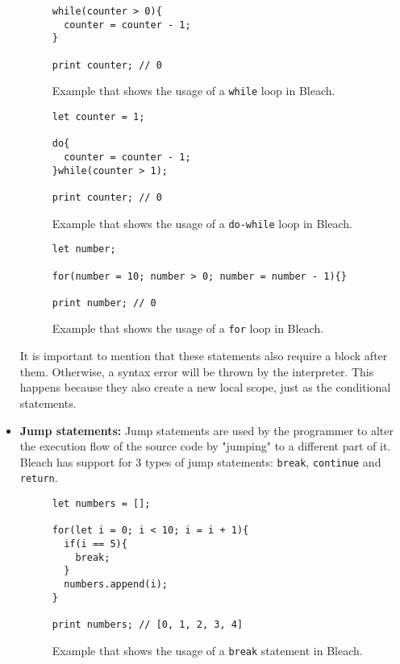 \begin{itemize}
\begin{figure}[H]
\begin{lstlisting}
while(counter > 0){
  counter = counter - 1;
}

print counter; // 0
    \end{lstlisting}
    \caption{Example that shows the usage of a \texttt{while} loop in Bleach.}
\end{figure}

\begin{figure}[H]
    \centering
    \begin{lstlisting}
let counter = 1;

do{
  counter = counter - 1;
}while(counter > 1);

print counter; // 0
    \end{lstlisting}
    \caption{Example that shows the usage of a \texttt{do-while} loop in Bleach.}
\end{figure}

\begin{figure}[H]
    \centering
    \begin{lstlisting}
let number;

for(number = 10; number > 0; number = number - 1){}

print number; // 0
    \end{lstlisting}
    \caption{Example that shows the usage of a \texttt{for} loop in Bleach.}
\end{figure}

    It is important to mention that these statements also require a block after them. Otherwise, a syntax error will be thrown by the interpreter. This happens because they also create a new local scope, just as the conditional statements.

    \item \textbf{Jump statements:} Jump statements are used by the programmer to alter the execution flow of the source code by "jumping" to a different part of it. Bleach has support for 3 types of jump statements: \texttt{break}, \texttt{continue} and \texttt{return}.

\begin{figure}[H]
    \centering
    \begin{lstlisting}
let numbers = [];

for(let i = 0; i < 10; i = i + 1){
  if(i == 5){
    break;
  }
  numbers.append(i);
}

print numbers; // [0, 1, 2, 3, 4]
    \end{lstlisting}
    \caption{Example that shows the usage of a \texttt{break} statement in Bleach.}
\end{figure}


\end{itemize}
